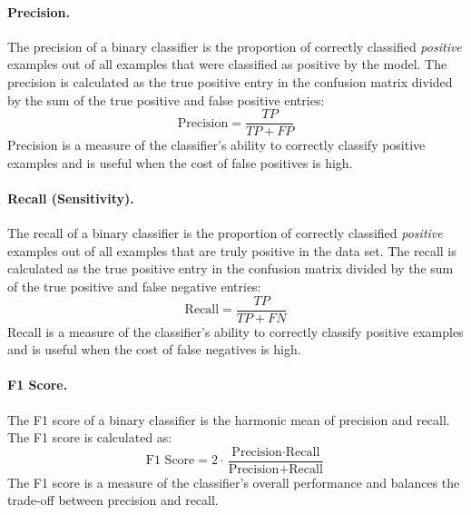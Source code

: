 \documentclass{article}[12pt]
\begin{document}
\paragraph*{Precision.}
The precision of a binary classifier is the proportion of correctly classified \textit{positive} examples out of all examples that were classified as positive by the model.
The precision is calculated as the true positive entry in the confusion matrix divided by the sum of the true positive and false positive entries:
\begin{equation*}
    \text{Precision} = \frac{TP}{TP + FP}
\end{equation*}
Precision is a measure of the classifier's ability to correctly classify positive examples and is useful when the cost of false positives is high.

\paragraph*{Recall (Sensitivity).}
The recall of a binary classifier is the proportion of correctly classified \textit{positive} examples out of all examples that are truly positive in the data set.
The recall is calculated as the true positive entry in the confusion matrix divided by the sum of the true positive and false negative entries:
\begin{equation*}
    \text{Recall} = \frac{TP}{TP + FN}
\end{equation*}
Recall is a measure of the classifier's ability to correctly classify positive examples and is useful when the cost of false negatives is high.

\paragraph*{F1 Score.}
The F1 score of a binary classifier is the harmonic mean of precision and recall. The F1 score is calculated as:
\begin{equation*}
    \text{F1 Score} = 2\cdot\frac{\text{Precision}\cdot\text{Recall}}{\text{Precision} + \text{Recall}}
\end{equation*}
The F1 score is a measure of the classifier's overall performance and balances the trade-off between precision and recall.
\end{document}
